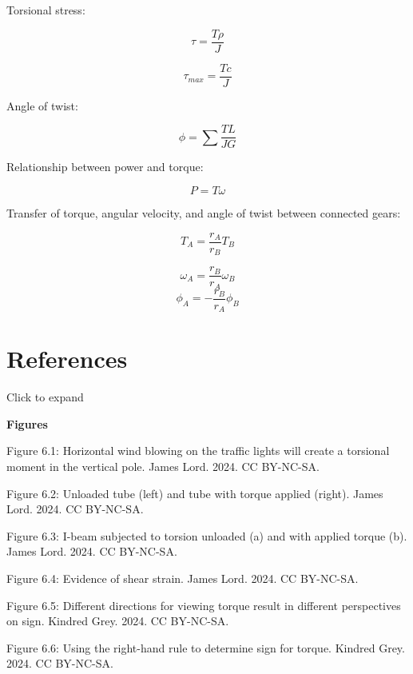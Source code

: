 \documentclass[
  letterpaper,
  DIV=11,
  numbers=noendperiod]{scrreprt}
\theoremstyle{definition}
\theoremstyle{remark}
\begin{document}
\begin{tcolorbox}[enhanced jigsaw, leftrule=.75mm, bottomrule=.15mm, opacityback=0, opacitybacktitle=0.6, colframe=quarto-callout-note-color-frame, toprule=.15mm, colbacktitle=quarto-callout-note-color!10!white, coltitle=black, bottomtitle=1mm, title={Key equations}, titlerule=0mm, toptitle=1mm, colback=white, rightrule=.15mm, left=2mm, arc=.35mm, breakable]

Torsional stress:

\[
\tau=\frac{T\rho}{J}
\]

\[
\tau_{max}=\frac{Tc}{J}
\]

Angle of twist:

\[
\phi=\sum\frac{TL}{JG}
\]

Relationship between power and torque:

\[
P=T\omega
\]

Transfer of torque, angular velocity, and angle of twist between
connected gears:

\[
T_A=\frac{r_A}{r_B}T_B
\]

\[
\omega_A=\frac{r_B}{r_A} \omega_B
\] \[
\phi_A=-\frac{r_B}{r_A} \phi_B
\]

\end{tcolorbox}

\section*{References}\label{references-5}


Click to expand

\textbf{Figures}

Figure 6.1: Horizontal wind blowing on the traffic lights will create a
torsional moment in the vertical pole. James Lord. 2024. CC BY-NC-SA.

Figure 6.2: Unloaded tube (left) and tube with torque applied (right).
James Lord. 2024. CC BY-NC-SA.

Figure 6.3: I-beam subjected to torsion unloaded (a) and with applied
torque (b). James Lord. 2024. CC BY-NC-SA.

Figure 6.4: Evidence of shear strain. James Lord. 2024. CC BY-NC-SA.

Figure 6.5: Different directions for viewing torque result in different
perspectives on sign. Kindred Grey. 2024. CC BY-NC-SA.

Figure 6.6: Using the right-hand rule to determine sign for torque.
Kindred Grey. 2024. CC BY-NC-SA.
\end{document}

